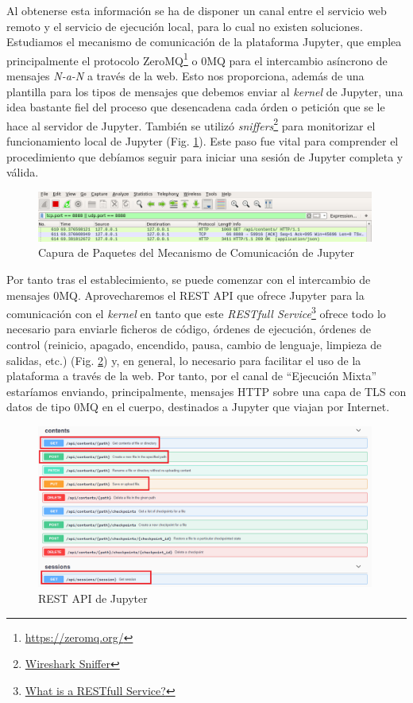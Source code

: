 Al obtenerse esta información se ha de disponer un canal entre el servicio web remoto y el servicio de ejecución local, para lo cual no existen soluciones. Estudiamos el mecanismo de comunicación de la plataforma Jupyter, que emplea principalmente el protocolo ZeroMQ\footnote{\url{https://zeromq.org/}} o 0MQ para el intercambio asíncrono de mensajes \textit{N-a-N} a través de la web. Esto nos proporciona, además de una plantilla para los tipos de mensajes que debemos enviar al \textit{kernel} de Jupyter, una idea bastante fiel del proceso que desencadena cada órden o petición que se le hace al servidor de Jupyter. También se utilizó \textit{sniffers}\footnote{\href{https://www.wireshark.org/\#1398253364-1-69}{Wireshark Sniffer}} para monitorizar el funcionamiento local de Jupyter (Fig. \ref{wireshark}). Este paso fue vital para comprender el procedimiento que debíamos seguir para iniciar una sesión de Jupyter completa y válida.

\begin{figure}[!hp]  \centering\noindent
    \includegraphics[width=0.99\textwidth]{figures/wireshark.png}
    \caption{Capura de Paquetes del Mecanismo de Comunicación de Jupyter}
    \label{wireshark}
\end{figure}

Por tanto tras el establecimiento, se puede comenzar con el intercambio de mensajes 0MQ. Aprovecharemos el REST API que ofrece Jupyter para la comunicación con el \textit{kernel} en tanto que este \textit{RESTfull Service}\footnote{\href{https://docs.oracle.com/javaee/6/tutorial/doc/gijqy.html}{What is a RESTfull Service?}} ofrece todo lo necesario para enviarle ficheros de código, órdenes de ejecución, órdenes de control (reinicio, apagado, encendido, pausa, cambio de lenguaje, limpieza de salidas, etc.) (Fig. \ref{jupyter_rest_api}) y, en general, lo necesario para facilitar el uso de la plataforma a través de la web. Por tanto, por el canal de ``Ejecución Mixta'' estaríamos enviando, principalmente, mensajes HTTP sobre una capa de TLS con datos de tipo 0MQ en el cuerpo, destinados a Jupyter que viajan por Internet.

\begin{figure}[!ht]  \centering\noindent
    \includegraphics[width=0.99\textwidth]{figures/jupyter_rest_api.png}
    \caption{REST API de Jupyter}
    \label{jupyter_rest_api}
\end{figure}

